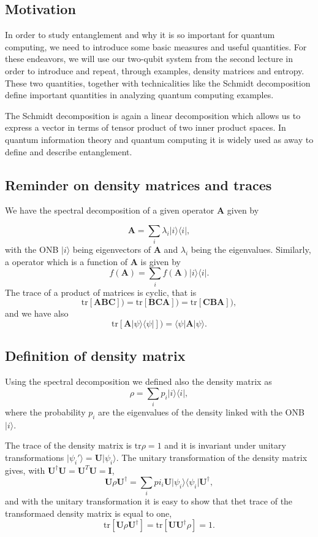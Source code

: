 \documentclass[%
oneside,                 %
final,                   %
10pt]{article}
\begin{document}
\subsection{Motivation}

In order to study entanglement and why it is so important for quantum
computing, we need to introduce some basic measures and useful
quantities.  For these endeavors, we  will use our two-qubit system from
the second lecture in order to introduce and repeat, through examples, density
matrices and entropy. These two quantities, together with
technicalities like the Schmidt decomposition define important quantities in analyzing quantum computing examples.

The Schmidt decomposition is again a
linear decomposition which allows us to express a vector in terms of
tensor product of two inner product spaces. In quantum information
theory and quantum computing it is widely used as away to define and
describe entanglement.

\subsection{Reminder on density matrices and traces}

We have the spectral decomposition of a given operator $\bm{A}$ given by

\[
\bm{A}=\sum_i\lambda_i\vert i \rangle\langle i\vert,
\]
with the ONB $\vert i\rangle$ being eigenvectors of $\bm{A}$ and $\lambda_i$ being the eigenvalues. Similarly, a operator which is a function of $\bm{A}$ is given by
\[
f(\bm{A})=\sum_if(\bm{A})\vert i \rangle\langle i\vert.
\]
The trace of a product of matrices is cyclic, that is
\[
\mathrm{tr}[\bm{ABC}])=\mathrm{tr}[\bm{BCA}])=\mathrm{tr}[\bm{CBA}]),
\]
and we have also 
\[
\mathrm{tr}[\bm{A}\vert \psi\rangle\langle\psi\vert])=\langle\psi\vert\bm{A}\vert\psi\rangle.
\]

\subsection{Definition of density matrix}

Using the spectral decomposition we defined also the density matrix as
\[
\rho = \sum_i p_i\vert i \rangle\langle i\vert,
\]
where the probability $p_i$ are the eigenvalues of the density linked with the ONB $\vert i \rangle$.

The trace of the density matrix is $\mathrm{tr}\rho=1$ and it is invariant under unitary transformations
$\vert \psi_i'\rangle = \bm{U}\vert \psi_i\rangle$.
The unitary transformation of the density matrix gives, with
$\bm{U}^{\dagger}\bm{U}=\bm{U}^{T}\bm{U}=\bm{I}$,
\[
\bm{U}\rho\bm{U}^{\dagger}=\sum_ipi_i\bm{U}\vert \psi_i\rangle\langle\psi_i\vert\bm{U}^{\dagger},
\]
and with the unitary transformation it is easy to show that thet trace of the transformaed density matrix is equal to one,
\[
\mathrm{tr}\left[ \bm{U}\rho\bm{U}^{\dagger}\right]=\mathrm{tr}\left[ \bm{U}\bm{U}^{\dagger}\rho\right]=1.
\]
\end{document}
